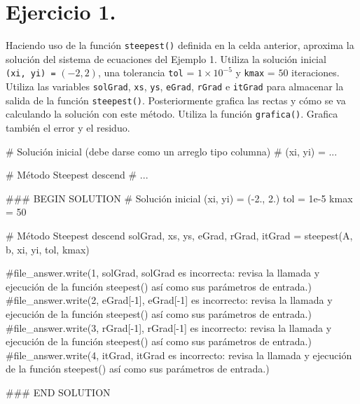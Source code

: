\documentclass[
  letterpaper,
  DIV=11,
  numbers=noendperiod]{scrreprt}
\newenvironment{Shaded}{\begin{snugshade}}{\end{snugshade}}
\newcommand{\CommentTok}[1]{\textcolor[rgb]{0.37,0.37,0.37}{#1}}
\newcommand{\DecValTok}[1]{\textcolor[rgb]{0.68,0.00,0.00}{#1}}
\newcommand{\FloatTok}[1]{\textcolor[rgb]{0.68,0.00,0.00}{#1}}
\newcommand{\NormalTok}[1]{\textcolor[rgb]{0.00,0.23,0.31}{#1}}
\newcommand{\OperatorTok}[1]{\textcolor[rgb]{0.37,0.37,0.37}{#1}}
\newcommand{\RegionMarkerTok}[1]{\textcolor[rgb]{0.00,0.23,0.31}{#1}}
\begin{document}
\section{\texorpdfstring{\textbf{Ejercicio
1.}}{Ejercicio 1.}}\label{ejercicio-1.-6}

Haciendo uso de la función \texttt{steepest()} definida en la celda
anterior, aproxima la solución del sistema de ecuaciones del Ejemplo 1.
Utiliza la solución inicial \texttt{(xi,\ yi)\ =} \((-2, 2)\), una
tolerancia \texttt{tol} = \(1 \times 10^{-5}\) y \texttt{kmax} = \(50\)
iteraciones. Utiliza las variables \texttt{solGrad}, \texttt{xs},
\texttt{ys}, \texttt{eGrad}, \texttt{rGrad} e \texttt{itGrad} para
almacenar la salida de la función \texttt{steepest()}. Posteriormente
grafica las rectas y cómo se va calculando la solución con este método.
Utiliza la función \texttt{grafica()}. Grafica también el error y el
residuo.

\begin{Shaded}
\begin{Highlighting}[]
\CommentTok{\# Solución inicial (debe darse como un arreglo tipo columna)}
\CommentTok{\# (xi, yi) = ...}

\CommentTok{\# Método Steepest descend}
\CommentTok{\# ...}

\CommentTok{\#\#\# }\RegionMarkerTok{BEGIN}\CommentTok{ SOLUTION}
\CommentTok{\# Solución inicial}
\NormalTok{(xi, yi) }\OperatorTok{=}\NormalTok{ (}\OperatorTok{{-}}\FloatTok{2.}\NormalTok{, }\FloatTok{2.}\NormalTok{)}
\NormalTok{tol }\OperatorTok{=} \FloatTok{1e{-}5}
\NormalTok{kmax }\OperatorTok{=} \DecValTok{50}

\CommentTok{\# Método Steepest descend}
\NormalTok{solGrad, xs, ys, eGrad, rGrad, itGrad  }\OperatorTok{=}\NormalTok{ steepest(A, b, xi, yi, tol, kmax)}

\CommentTok{\#file\_answer.write(\textquotesingle{}1\textquotesingle{}, solGrad, \textquotesingle{}solGrad es incorrecta: revisa la llamada y ejecución de la función steepest() así como sus parámetros de entrada.\textquotesingle{})}
\CommentTok{\#file\_answer.write(\textquotesingle{}2\textquotesingle{}, eGrad[{-}1], \textquotesingle{}eGrad[{-}1] es incorrecto: revisa la llamada y ejecución de la función steepest() así como sus parámetros de entrada.\textquotesingle{})}
\CommentTok{\#file\_answer.write(\textquotesingle{}3\textquotesingle{}, rGrad[{-}1], \textquotesingle{}rGrad[{-}1] es incorrecto: revisa la llamada y ejecución de la función steepest() así como sus parámetros de entrada.\textquotesingle{})}
\CommentTok{\#file\_answer.write(\textquotesingle{}4\textquotesingle{}, itGrad, \textquotesingle{}itGrad es incorrecto: revisa la llamada y ejecución de la función steepest() así como sus parámetros de entrada.\textquotesingle{})}

\CommentTok{\#\#\# }\RegionMarkerTok{END}\CommentTok{ SOLUTION}
\end{Highlighting}
\end{Shaded}
\end{document}
